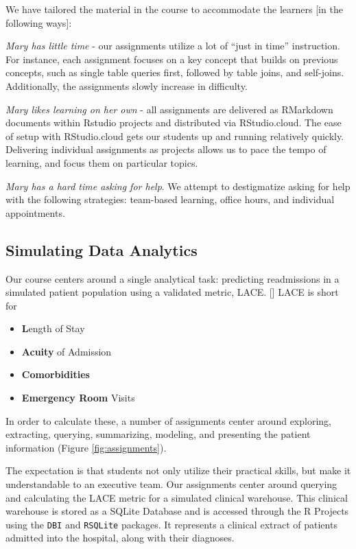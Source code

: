 We have tailored the material in the course to accommodate the learners
{[}in the following ways{]}:

\emph{Mary has little time} - our assignments utilize a lot of ``just in
time'' instruction. For instance, each assignment focuses on a key
concept that builds on previous concepts, such as single table queries
first, followed by table joins, and self-joins. Additionally, the
assignments slowly increase in difficulty.

\emph{Mary likes learning on her own} - all assignments are delivered as
RMarkdown documents within Rstudio projects and distributed via
RStudio.cloud. The ease of setup with RStudio.cloud gets our students up
and running relatively quickly. Delivering individual assignments as
projects allows us to pace the tempo of learning, and focus them on
particular topics.

\emph{Mary has a hard time asking for help}. We attempt to destigmatize
asking for help with the following strategies: team-based learning,
office hours, and individual appointments.

\hypertarget{simulating-data-analytics}{%
\subsection{Simulating Data Analytics}\label{simulating-data-analytics}}

Our course centers around a single analytical task: predicting
readmissions in a simulated patient population using a validated metric,
LACE. {[}{]} LACE is short for

\begin{itemize}
\tightlist
\item
  \textbf{L}ength of Stay
\item
  \textbf{Acuity} of Admission
\item
  \textbf{Comorbidities}
\item
  \textbf{Emergency Room} Visits
\end{itemize}

In order to calculate these, a number of assignments center around
exploring, extracting, querying, summarizing, modeling, and presenting
the patient information (Figure \ref{fig:assignments}).

The expectation is that students not only utilize their practical
skills, but make it understandable to an executive team. Our assignments
center around querying and calculating the LACE metric for a simulated
clinical warehouse. This clinical warehouse is stored as a SQLite
Database and is accessed through the R Projects using the \texttt{DBI}
and \texttt{RSQLite} packages. It represents a clinical extract of
patients admitted into the hospital, along with their diagnoses.

